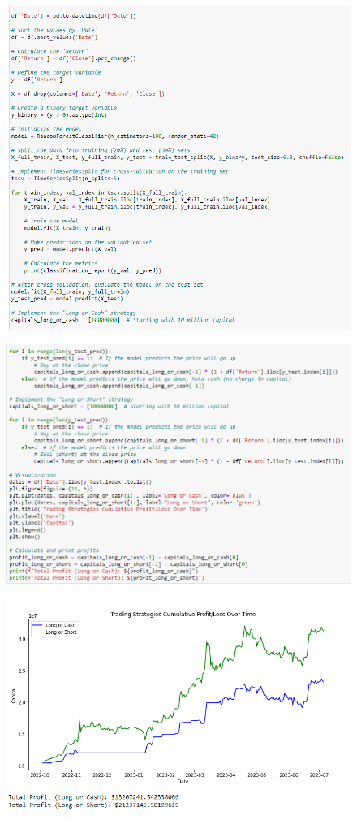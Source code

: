 \begin{figure}[H]
\centering
\includegraphics[scale=0.65]{fig25.jpg}
\end{figure}
\begin{figure}[H]
\centering
\includegraphics[scale=0.65]{fig26.jpg}
\end{figure}

\begin{figure}[H]
\centering
\includegraphics[scale=0.65]{fig27.jpg}
\end{figure}

